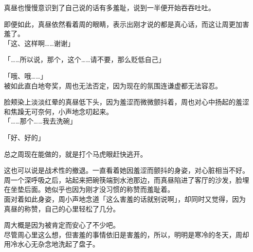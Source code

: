 真昼也慢慢意识到了自己说的话有多羞耻，说到一半便开始吞吞吐吐。

即便如此，真昼依然看着周的眼睛，表示出刚才说的都是真心话，而这让周更加害羞了。\\

「这、这样啊……谢谢」

「……所以说，那个，这个……请不要，那么贬低自己」

「哦、哦……」\\

被如此直白地夸奖，周也无法否定，因为现在的氛围连谦虚都无法容忍。

脸颊染上淡淡红晕的真昼低下头，因为羞涩而微微颤抖着，周也对心中扬起的羞涩和焦躁无可奈何，小声地念叨起来。\\

「……那个……我去洗碗」

「好、好的」

总之周现在能做的，就是打个马虎眼赶快逃开。

这也可以说是战术性的撤退。一直看着她因羞涩而颤抖的身姿，对心脏相当不好。\\

周一个深呼吸之后，站起来把碗筷端到水池那边，而真昼陷进了客厅的沙发，脸埋在坐垫后面。她似乎也因为刚才没习惯的称赞而羞耻着。\\

面对着如此身姿，周小声地念道「这么害羞的话就别说啊」，却同时又觉得，因为真昼的称赞，自己的心里轻松了几分。

周大概是因为被肯定而安心了不少吧。\\

尽管周心里这么想，但害羞的事情依旧是害羞的，所以，明明是寒冷的冬天，周却用冷水心无杂念地洗起了盘子。

